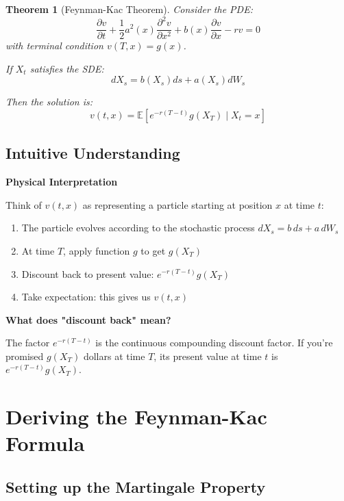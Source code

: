 \documentclass[11pt,a4paper]{article}
\newtheorem{theorem}{Theorem}[section]
\newenvironment{remarkbox}[1][Remark]
{\begin{leftbar}\noindent\textbf{\color{remarkred}#1}\par\vspace{0.5em}}
{\end{leftbar}}
\newenvironment{examplebox}[1][Example]
{\begin{leftbar}\noindent\textbf{\color{examplegreen}#1}\par\vspace{0.5em}}
{\end{leftbar}}
\begin{document}
\begin{theorem}[Feynman-Kac Theorem]
Consider the PDE:
\begin{equation}
\frac{\partial v}{\partial t} + \frac{1}{2}a^2(x) \frac{\partial^2 v}{\partial x^2} + b(x) \frac{\partial v}{\partial x} - rv = 0
\end{equation}
with terminal condition $v(T,x) = g(x)$.

If $X_t$ satisfies the SDE:
\begin{equation}
dX_s = b(X_s)ds + a(X_s)dW_s
\end{equation}

Then the solution is:
\begin{equation}
v(t,x) = \mathbb{E}\left[e^{-r(T-t)}g(X_T) \mid X_t = x\right]
\end{equation}
\end{theorem}

\subsection{Intuitive Understanding}

\begin{examplebox}[Physical Interpretation]
Think of $v(t,x)$ as representing a particle starting at position $x$ at time $t$:
\begin{enumerate}
    \item The particle evolves according to the stochastic process $dX_s = b\,ds + a\,dW_s$
    \item At time $T$, apply function $g$ to get $g(X_T)$
    \item Discount back to present value: $e^{-r(T-t)}g(X_T)$
    \item Take expectation: this gives us $v(t,x)$
\end{enumerate}
\end{examplebox}

\begin{remarkbox}[What does "discount back" mean?]
The factor $e^{-r(T-t)}$ is the continuous compounding discount factor. If you're promised $g(X_T)$ dollars at time $T$, its present value at time $t$ is $e^{-r(T-t)}g(X_T)$.
\end{remarkbox}

\section{Deriving the Feynman-Kac Formula}

\subsection{Setting up the Martingale Property}
\end{document}
